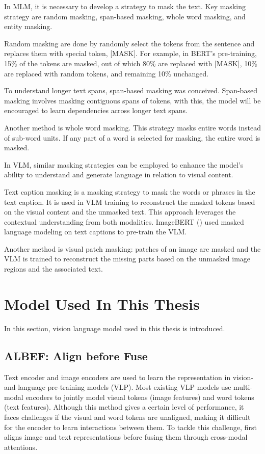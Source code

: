 In MLM, it is necessary to develop a strategy to mask the text. Key masking strategy are random masking, span-based masking, whole word masking, and entity masking. 

Random masking are done by randomly select the tokens from the sentence and replaces them with special token, [MASK]. For example, in BERT's pre-training, 15\% of the tokens are masked, out of which 80\% are replaced with [MASK], 10\% are replaced with random tokens, and remaining 10\% unchanged. 

To understand longer text spans, span-based masking was conceived. Span-based masking involves masking contiguous spans of tokens, with this, the model will be encouraged to learn dependencies across longer text spans. 

Another method is whole word masking. This strategy masks entire words instead of sub-word units. If any part of a word is selected for masking, the entire word is masked.

In VLM, similar masking strategies can be employed to enhance the model's ability to understand and generate language in relation to visual content.

Text caption masking is a masking strategy to mask the words or phrases in the text caption. It is used in VLM training to reconstruct the masked tokens based on the visual content and the unmasked text. This approach leverages the contextual understanding from both modalities. ImageBERT (\cite{qi2020imagebertcrossmodalpretraininglargescale}) used masked language modeling on text captions to pre-train the VLM.

Another method is visual patch masking: patches of an image are masked and the VLM is trained to reconstruct the missing parts based on the unmasked image regions and the associated text.

\section{Model Used In This Thesis}
In this section, vision language model used in this thesis is introduced.

\subsection{ALBEF: Align before Fuse}
Text encoder and image encoders are used to learn the representation in vision-and-language pre-training models (VLP). Most existing VLP models use multi-modal encoders to jointly model visual tokens (image features) and word tokens (text features). Although this method gives a certain level of performance, it faces challenges if the visual and word tokens are unaligned, making it difficult for the encoder to learn interactions between them. 
To tackle this challenge, \cite{li2021align} first aligns image and text representations before fusing them through cross-modal attentions. 

